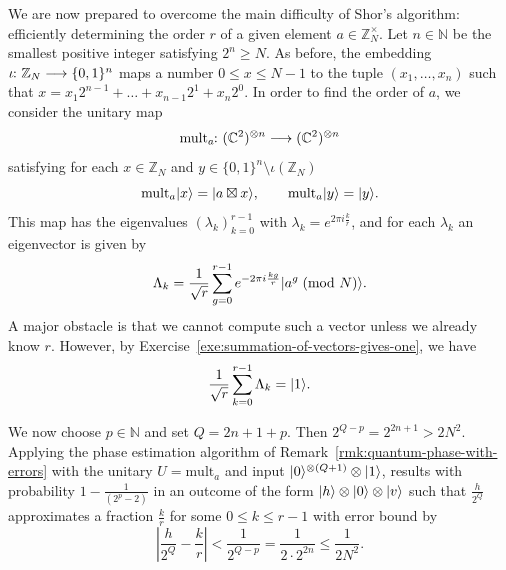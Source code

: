 \documentclass[a4paper, oneside, 12pt]{amsart}
\begin{document}
We are now prepared to overcome the main difficulty of Shor's algorithm: efficiently determining the order \(r\) of a given element \(a \in \mathbb{Z}_{N}^{\times}\).
Let \(n \in \mathbb{N}\) be the smallest positive integer satisfying \(2^{n}\geq N\).
As before, the embedding \(\iota\from \mathbb{Z}_{N} \to\{0,1\}^{n}\) maps a number \(0\leq x \leq N-1\) to the tuple \((x_{1}, \dots , x_{n})\) such that \(x = x_{1}2^{n-1} + \dots + x_{n-1} 2^{1} + x_{n}2^{0}\).
In order to find the order of \(a\), we consider the unitary map
\begin{equation}
  \mathrm{mult}_{a} \from ( \mathbb{C}^{2})^{\otimes n} \to ( \mathbb{C}^{2})^{ \otimes n}
\end{equation}
satisfying for each \(x \in \mathbb{Z}_{N}\) and \(y \in\{0,1\}^{n} \setminus \iota(\mathbb{Z}_{N})\)
\begin{equation*}
  \mathrm{mult}_{a}\lvert x\rangle = \lvert a \boxtimes x\rangle , \qquad \mathrm{mult}_{a}\lvert y\rangle = \lvert y\rangle.
\end{equation*}
This map has the eigenvalues \((\lambda_{k})_{k=0}^{r-1}\) with \(\lambda_{k} = e^{2\pi i \tfrac{k}{r}}\), and for each \(\lambda_{k}\) an eigenvector is given by
\begin{equation}\label{eq:eigenvectors-order-a}
  \Lambda_{k} = \frac{1}{\sqrt r }\sum_{g=0}^{r-1} e^{-2\pi i \frac{kg}{r}} \lvert a^{g} \; (\text{mod } N)\rangle.
\end{equation}
A major obstacle is that we cannot compute such a vector unless we already know \(r\).
However, by Exercise~\ref{exe:summation-of-vectors-gives-one}, we have
\begin{equation*}
  \frac{1}{\sqrt{r}}\sum_{k=0}^{r-1} \Lambda_{k} =\lvert1\rangle.
\end{equation*}

We now choose \(p \in \mathbb{N}\) and set \(Q = 2n + 1 + p\).
Then \(2^{Q-p} = 2^{2n+1} > 2N^2\).
Applying the phase estimation algorithm of Remark~\ref{rmk:quantum-phase-with-errors} with the unitary \(U = \mathrm{mult}_{a}\) and input \(\lvert0\rangle^{\otimes (Q+1)}\otimes \lvert1\rangle\), results with probability \(1- \tfrac{1}{(2^{p}-2)}\) in an outcome of the form \(\lvert h\rangle \otimes \lvert0\rangle \otimes \lvert v\rangle\) such that
 \(\tfrac{h}{2^Q}\) approximates a fraction \(\tfrac{k}{r}\) for some \(0\leq k \leq r-1\) with error bound by
\begin{equation}\label{eq:qpe-precision}
  \left|\frac{h}{2^Q} - \frac{k}{r}\right| < \frac{1}{2^{Q-p}} = \frac{1}{2 \cdot 2^{2n}} \leq \frac{1}{2N^2}.
\end{equation}
\end{document}
